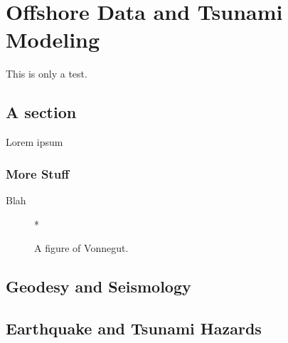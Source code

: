 
\chapter{Offshore Data and Tsunami Modeling}
This is only a test.
\section{A section}
Lorem ipsum
\subsection{More Stuff}
Blah

\begin{figure}[h] 
  \centering
  *
  \caption{A figure of Vonnegut.} 
\end{figure}

\section{Geodesy and Seismology}

\section{Earthquake and Tsunami Hazards}



